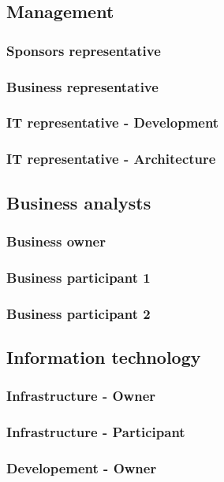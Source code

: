 \documentclass[8pt]{article} %
\begin{document}
\subsection{Management}
\subsubsection{Sponsors representative}
\subsubsection{Business representative}
\subsubsection{IT representative - Development}
\subsubsection{IT representative - Architecture}

\subsection{Business analysts}
\subsubsection{Business owner}
\subsubsection{Business participant 1}
\subsubsection{Business participant 2}

\subsection{Information technology}
\subsubsection{Infrastructure - Owner}
\subsubsection{Infrastructure - Participant}
\subsubsection{Developement - Owner}
\end{document}
